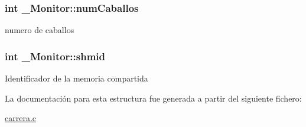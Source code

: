 \subsubsection[{\texorpdfstring{num\+Caballos}{numCaballos}}]{\setlength{\rightskip}{0pt plus 5cm}int \+\_\+\+Monitor\+::num\+Caballos}\hypertarget{struct__Monitor_a5a1c304eaa4f2cca52dc2d5ac937894e}{}\label{struct__Monitor_a5a1c304eaa4f2cca52dc2d5ac937894e}
numero de caballos 
\subsubsection[{\texorpdfstring{shmid}{shmid}}]{\setlength{\rightskip}{0pt plus 5cm}int \+\_\+\+Monitor\+::shmid}\hypertarget{struct__Monitor_aa927c580f30b2085647032599b6dde4c}{}\label{struct__Monitor_aa927c580f30b2085647032599b6dde4c}
Identificador de la memoria compartida 

La documentación para esta estructura fue generada a partir del siguiente fichero\+:\begin{DoxyCompactItemize}
\item 
\hyperlink{carrera_8c}{carrera.\+c}\end{DoxyCompactItemize}
